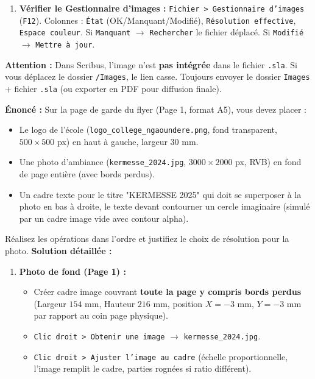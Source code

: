 \documentclass[11pt]{article}
\begin{document}
\begin{methode}
\begin{enumerate}
        \item \textbf{Vérifier le Gestionnaire d'images :} \texttt{Fichier > Gestionnaire d'images} (\texttt{F12}). Colonnes : \texttt{État} (OK/Manquant/Modifié), \texttt{Résolution effective}, \texttt{Espace couleur}. Si \texttt{Manquant} $\rightarrow$ \texttt{Rechercher} le fichier déplacé. Si \texttt{Modifié} $\rightarrow$ \texttt{Mettre à jour}.
    \end{enumerate}
    \textbf{Attention :} Dans Scribus, l'image n'est \textbf{pas intégrée} dans le fichier \texttt{.sla}. Si vous déplacez le dossier \texttt{/Images}, le lien casse. Toujours envoyer le dossier \texttt{Images} + fichier \texttt{.sla} (ou exporter en PDF pour diffusion finale).
\end{methode}

\begin{exoresolu}
    \textbf{Énoncé :} Sur la page de garde du flyer (Page 1, format A5), vous devez placer :
    \begin{itemize}
        \item Le logo de l'école (\texttt{logo\_college\_ngaoundere.png}, fond transparent, $500 \times 500$ px) en haut à gauche, largeur $30$ mm.
        \item Une photo d'ambiance (\texttt{kermesse\_2024.jpg}, $3000 \times 2000$ px, RVB) en fond de page entière (avec bords perdus).
        \item Un cadre texte pour le titre "KERMESSE 2025" qui doit se superposer à la photo en bas à droite, le texte devant contourner un cercle imaginaire (simulé par un cadre image vide avec contour alpha).
    \end{itemize}
    Réalisez les opérations dans l'ordre et justifiez le choix de résolution pour la photo.
    \tcblower
    \textbf{Solution détaillée :}
    \begin{enumerate}
        \item \textbf{Photo de fond (Page 1) :}
              \begin{itemize}
                  \item Créer cadre image couvrant \textbf{toute la page y compris bords perdus} (Largeur $154$ mm, Hauteur $216$ mm, position $X=-3$ mm, $Y=-3$ mm par rapport au coin page physique).
                  \item \texttt{Clic droit > Obtenir une image} $\rightarrow$ \texttt{kermesse\_2024.jpg}.
                  \item \texttt{Clic droit > Ajuster l'image au cadre} (échelle proportionnelle, l'image remplit le cadre, parties rognées si ratio différent).

\end{itemize}
\end{enumerate}
\end{exoresolu}
\end{document}
